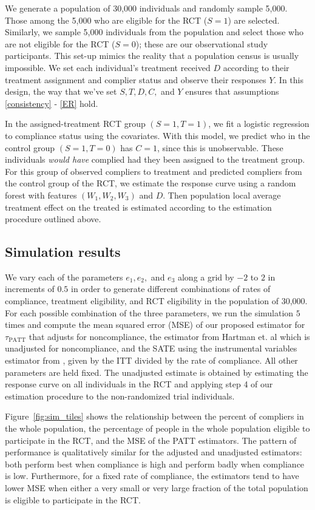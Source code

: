 \documentclass[12pt]{article}
\begin{document}
We generate a population of 30,000 individuals and randomly sample 5,000.  Those among the 5,000 who are eligible for the RCT ($S=1$) are selected. Similarly, we sample 5,000 individuals from the population and select those who are not eligible for the RCT ($S=0$); these are our observational study participants. This set-up mimics the reality that a population census is usually impossible. We set each individual's treatment received $D$ according to their treatment assignment and complier status and observe their responses $Y$.  In this design, the way that we've set $S, T, D, C,$ and $Y$ ensures that assumptions \eqref{consistency} - \eqref{ER} hold.
 
In the assigned-treatment RCT group $(S = 1, T = 1)$, we fit a logistic regression to compliance status using the covariates.  With this model, we predict who in the control group $(S = 1, T = 0)$ has $C=1$, since this is unobservable.  These individuals \textit{would have} complied had they been assigned to the treatment group.  For this group of observed compliers to treatment and predicted compliers from the control group of the RCT, we estimate the response curve using a random forest with features $(W_1, W_2, W_3)$ and $D$.  Then population local average treatment effect on the treated is estimated according to the estimation procedure outlined above.

\subsection{Simulation results}

We vary each of the parameters $e_1, e_2,$ and $e_3$ along a grid by $-2$ to $2$ in increments of $0.5$ in order to generate different combinations of rates of compliance, treatment eligibility, and RCT eligibility in the population of 30,000.  For each possible combination of the three parameters, we run the simulation $5$ times and compute the mean squared error (MSE) of our proposed estimator for $\tau_{\text{PATT}}$ that adjusts for noncompliance, the estimator from Hartman et. al which is unadjusted for noncompliance, and the SATE using the instrumental variables estimator from \cite{Angrist1996}, given by the ITT divided by the rate of compliance.  All other parameters are held fixed. The unadjusted estimate is obtained by estimating the response curve on all individuals in the RCT and applying step 4 of our estimation procedure to the non-randomized trial individuals. 

Figure~\ref{fig:sim_tiles} shows the relationship between the percent of compliers in the whole population, the percentage of people in the whole population eligible to participate in the RCT, and the MSE of the PATT estimators.  The pattern of performance is qualitatively similar for the adjusted and unadjusted estimators: both perform best when compliance is high and perform badly when compliance is low.  Furthermore, for a fixed rate of compliance, the estimators tend to have lower MSE when either a very small or very large fraction of the total population is eligible to participate in the RCT. 
\end{document}
